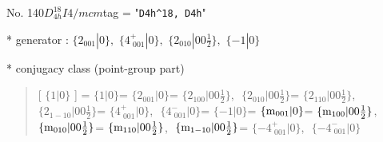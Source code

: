 \documentclass[fleqn,10pt,landscape]{jsarticle}
\begin{document}
\newpage

No. 140\quad$D_{4h}^{18}$\quad$I4/mcm$\quad[ tetragonal ]
tag = "{\tt D4h^18, D4h}"

* generator : $\{2{}_{001}|0\},\,\,\{4^{+}_{\,\,001}|0\},\,\,\{2{}_{010}|0 0 \frac{1}{2}\},\,\,\{-1|0\}$

* conjugacy class (point-group part)
\begin{quote}
[ $\{1|0\}$ ] = \quad $\{1|0\}$\newline[ $\{2{}_{001}|0\}$ ] = \quad $\{2{}_{001}|0\}$\newline[ $\{2{}_{100}|0 0 \frac{1}{2}\}$ ] = \quad $\{2{}_{100}|0 0 \frac{1}{2}\}$,\,\, $\{2{}_{010}|0 0 \frac{1}{2}\}$\newline[ $\{2{}_{110}|0 0 \frac{1}{2}\}$ ] = \quad $\{2{}_{110}|0 0 \frac{1}{2}\}$,\,\, $\{2{}_{1-10}|0 0 \frac{1}{2}\}$\newline[ $\{4^{+}_{\,\,001}|0\}$ ] = \quad $\{4^{+}_{\,\,001}|0\}$,\,\, $\{4^{-}_{\,\,001}|0\}$\newline[ $\{-1|0\}$ ] = \quad $\{-1|0\}$\newline[ $\{{\rm m}_{001}|0\}$ ] = \quad $\{{\rm m}_{001}|0\}$\newline[ $\{{\rm m}_{100}|0 0 \frac{1}{2}\}$ ] = \quad $\{{\rm m}_{100}|0 0 \frac{1}{2}\}$,\,\, $\{{\rm m}_{010}|0 0 \frac{1}{2}\}$\newline[ $\{{\rm m}_{110}|0 0 \frac{1}{2}\}$ ] = \quad $\{{\rm m}_{110}|0 0 \frac{1}{2}\}$,\,\, $\{{\rm m}_{1-10}|0 0 \frac{1}{2}\}$\newline[ $\{-4^{+}_{\,\,001}|0\}$ ] = \quad $\{-4^{+}_{\,\,001}|0\}$,\,\, $\{-4^{-}_{\,\,001}|0\}$\newline
\end{quote}
\end{document}
